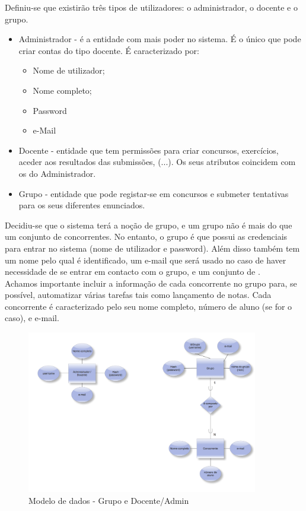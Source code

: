 Definiu-se que existirão três tipos de utilizadores: o administrador, o docente e o grupo.\\

\begin{itemize}
  \item Administrador - é a entidade com mais poder no sistema. É o único que pode criar contas do tipo docente. É caracterizado por:
    \begin{itemize}
      \item Nome de utilizador;
      \item Nome completo;
      \item Password
      \item e-Mail
    \end{itemize}
  \item Docente - entidade que tem permissões para criar concursos, exercícios, aceder aos resultados das submissões, (...). 
Os seus atributos coincidem com os do Administrador.
  \item Grupo - entidade que pode registar-se em concursos e submeter tentativas para os seus diferentes enunciados.
\end{itemize}

Decidiu-se que o sistema terá a noção de grupo, e um grupo não é mais do que um conjunto de concorrentes. No entanto,
o grupo é que possui as credenciais para entrar no sistema (nome de utilizador e password). 
Além disso também tem um nome pelo qual é identificado, um e-mail que será usado no caso de haver necessidade de se entrar em contacto
com o grupo, e um conjunto de .\\

Achamos importante incluir a informação de cada concorrente no grupo para, se possível, automatizar várias tarefas tais como lançamento de notas.
Cada concorrente é caracterizado pelo seu nome completo, número de aluno (se for o caso), e e-mail.\\

\begin{figure}[htbp]
\begin{center}
\includegraphics[width=0.9\textwidth]{Images/grupo-docente}
\caption{Modelo de dados - Grupo e Docente/Admin}\label{fig modedados-grupo-doc}
\end{center}
\end{figure}


